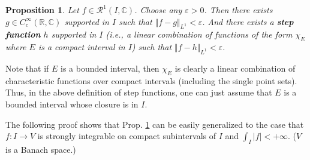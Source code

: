 \documentclass[12pt,b5paper,notitlepage]{article}
\theoremstyle{definition}
\theoremstyle{plain}
\newtheorem{pp}[df]{Proposition}
\newcommand{\scr}{\mathscr}
\newcommand{\Cbb}{\mathbb C}
\newcommand{\Rbb}{\mathbb R}
\newcommand{\eps}{\varepsilon}
\numberwithin{equation}{section}
\begin{document}
\begin{pp}\label{lb445}
Let $f\in\scr R^1(I,\Cbb)$. Choose any $\eps>0$. Then there exists $g\in C_c^\infty(\Rbb,\Cbb)$ supported in $I$ such that $\Vert f-g\Vert_{L^1}<\eps$. And there exists a \textbf{step function} $h$ supported in $I$ (i.e., a linear combination of functions of the form $\chi_E$ where $E$ is a compact interval in $I$) such that $\Vert f-h\Vert_{L^1}<\eps$.
\end{pp}

Note that if $E$ is a bounded interval, then $\chi_E$ is clearly a linear combination of characteristic functions over compact intervals (including the single point sets). Thus, in the above definition of step functions, one can just assume that $E$ is a bounded interval whose closure is in $I$.

The following proof shows that Prop. \ref{lb445} can be easily generalized to the case that $f:I\rightarrow V$ is strongly integrable on compact subintervals of $I$ and $\int_I|f|<+\infty$. ($V$ is a Banach space.)
\end{document}
